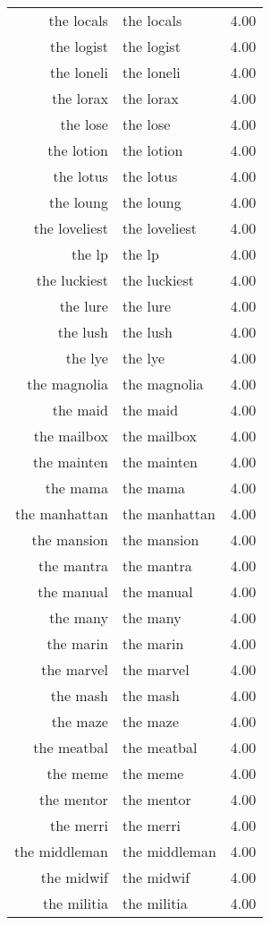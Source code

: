 \begin{table}[ht]
\begin{tabular}{rlr}
  the locals & the locals & 4.00 \\ 
  the logist & the logist & 4.00 \\ 
  the loneli & the loneli & 4.00 \\ 
  the lorax & the lorax & 4.00 \\ 
  the lose & the lose & 4.00 \\ 
  the lotion & the lotion & 4.00 \\ 
  the lotus & the lotus & 4.00 \\ 
  the loung & the loung & 4.00 \\ 
  the loveliest & the loveliest & 4.00 \\ 
  the lp & the lp & 4.00 \\ 
  the luckiest & the luckiest & 4.00 \\ 
  the lure & the lure & 4.00 \\ 
  the lush & the lush & 4.00 \\ 
  the lye & the lye & 4.00 \\ 
  the magnolia & the magnolia & 4.00 \\ 
  the maid & the maid & 4.00 \\ 
  the mailbox & the mailbox & 4.00 \\ 
  the mainten & the mainten & 4.00 \\ 
  the mama & the mama & 4.00 \\ 
  the manhattan & the manhattan & 4.00 \\ 
  the mansion & the mansion & 4.00 \\ 
  the mantra & the mantra & 4.00 \\ 
  the manual & the manual & 4.00 \\ 
  the many & the many & 4.00 \\ 
  the marin & the marin & 4.00 \\ 
  the marvel & the marvel & 4.00 \\ 
  the mash & the mash & 4.00 \\ 
  the maze & the maze & 4.00 \\ 
  the meatbal & the meatbal & 4.00 \\ 
  the meme & the meme & 4.00 \\ 
  the mentor & the mentor & 4.00 \\ 
  the merri & the merri & 4.00 \\ 
  the middleman & the middleman & 4.00 \\ 
  the midwif & the midwif & 4.00 \\ 
  the militia & the militia & 4.00 \\ 

\end{tabular}
\end{table}
